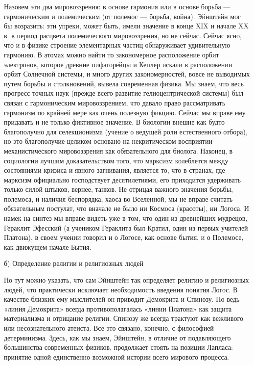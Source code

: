 Назовем эти два мировоззрения: в основе гармония или в основе борьба ---
гармоническим и полемическим (от полемос --- борьба, война). Эйнштейн мог бы
возразить: эти упреки, может быть, имели значение в конце XIX и начале XX в. в
период расцвета полемического мировоззрения, но не сейчас. Сейчас ясно, что и в
физике строение элементарных частиц обнаруживает удивительную гармонию. В
атомах можно найти то закономерное расположение орбит электронов, которое
древние пифагорейцы и Кеплер искали в расположении орбит Солнечной системы, и
много других закономерностей, вовсе не выводимых путем борьбы и столкновений,
вывела современная физика. Мы знаем, что весь прогресс точных наук (прежде
всего развитие гелиоцентрической системы) был связан с гармоническим
мировоззрением, что давало право рассматривать гармонизм по крайней мере как
очень полезную фикцию. Сейчас мы вправе ему придавать и не только фиктивное
значение. В биологии внешне как будто благополучно для селекционизма (учение о
ведущей роли естественного отбора), но это благополучие целиком основано на
некритическом восприятии механистического мировоззрения как обязательного для
биолога. Наконец, в социологии лучшим доказательством того, что марксизм
колеблется между состояниями кризиса и явного загнивания, является то, что в
странах, где марксизм официально господствует десятилетиями, его приходится
удерживать только силой штыков, вернее, танков. Не отрицая важного значения
борьбы, полемоса, и наличия беспорядка, хаоса во Вселенной, мы не вправе
считать обязательным постулат, что вначале не было ни Космоса (красоты), ни
Логоса. И намек на синтез мы вправе видеть уже в том, что один из древнейших
мудрецов, Гераклит Эфесский (а учеником Гераклита был Кратил, один из первых
учителей Платона), в своем учении говорил и о Логосе, как основе бытия, и о
Полемосе, как движущем начале Бытия.

б) Определение религии и религиозных людей

Но тут можно указать, что сам Эйнштейн так определяет религию и религиозных
людей, что практически исключает необходимость введения понятия Логос. В
качестве близких ему мыслителей он приводит Демокрита и Спинозу. Но ведь «линия
Демокрита» всегда противополагалась «линии Платона» как защита материализма и
отрицание религии. Спинозу же всегда трактуют как вежливого или несознательного
атеиста. Все это связано, конечно, с философией детерминизма. Здесь, как мы
знаем, Эйнштейн, в отличие от подавляющего большинства современных физиков,
продолжает стоять на позиции Лапласа: принятие одной единственно возможной
истории всего мирового процесса.

